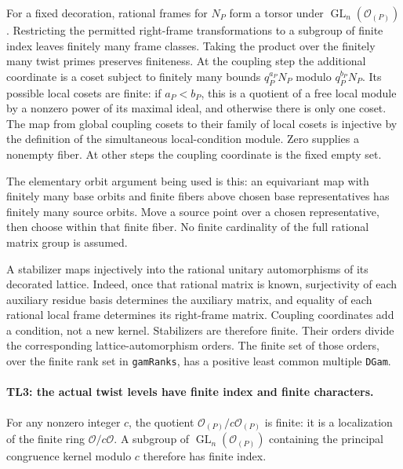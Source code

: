 For a fixed decoration, rational frames for $N_P$ form a torsor under
$\operatorname{GL}_n(\mathcal O_{(P)})$. Restricting the permitted
right-frame transformations to a subgroup of finite index leaves
finitely many frame classes. Taking the product over the finitely
many twist primes preserves finiteness. At the coupling step the
additional coordinate is a coset subject to finitely many bounds
$q_P^{a_P}N_P$ modulo $q_P^{b_P}N_P$. Its possible local cosets are
finite: if $a_P<b_P$, this is a quotient of a free local module by
a nonzero power of its maximal ideal, and otherwise there is only
one coset. The map from global coupling cosets to their family of
local cosets is injective by the definition of the simultaneous
local-condition module. Zero supplies a nonempty fiber. At other
steps the coupling coordinate is the fixed empty set.

The elementary orbit argument being used is this: an equivariant
map with finitely many base orbits and finite fibers above chosen
base representatives has finitely many source orbits. Move a source
point over a chosen representative, then choose within that finite
fiber. No finite cardinality of the full rational matrix group is
assumed.

A stabilizer maps injectively into the rational unitary automorphisms
of its decorated lattice. Indeed, once that rational matrix is known,
surjectivity of each auxiliary residue basis determines the auxiliary
matrix, and equality of each rational local frame determines its
right-frame matrix. Coupling coordinates add a condition, not a new
kernel. Stabilizers are therefore finite. Their orders divide the
corresponding lattice-automorphism orders. The finite set of those
orders, over the finite rank set in \texttt{gamRanks}, has a positive
least common multiple \texttt{DGam}.

\paragraph{TL3: the actual twist levels have finite index and finite
characters.}
For any nonzero integer $c$, the quotient
$\mathcal O_{(P)}/c\mathcal O_{(P)}$ is finite: it is a localization
of the finite ring $\mathcal O/c\mathcal O$. A subgroup of
$\operatorname{GL}_n(\mathcal O_{(P)})$ containing the principal
congruence kernel modulo $c$ therefore has finite index.

